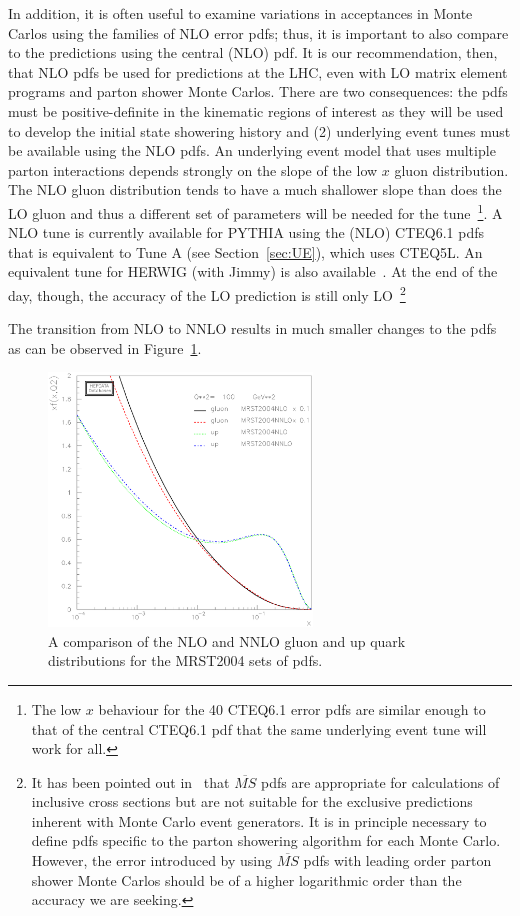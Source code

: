 \documentclass[12pt]{iopart}
\begin{document}
In addition, it is often useful to examine variations in acceptances in Monte Carlos using the
families of NLO error pdfs; thus, it is important to also compare to the predictions using the central (NLO) pdf.  It is our
recommendation, then,  that NLO pdfs be used for predictions at the LHC, even with LO matrix element programs and parton shower Monte
Carlos. There are two consequences: the pdfs must be positive-definite in the kinematic regions of interest as they will be
used to develop the initial state showering history and (2) underlying event tunes must be available using  the NLO pdfs. An
underlying event model that uses multiple parton interactions depends strongly on the slope of the low $x$  gluon  distribution.
The NLO gluon distribution  tends to have a much shallower slope than does the LO gluon and thus a different set of parameters
will  be needed for the tune~\footnote{The low $x$ behaviour for the 40 CTEQ6.1 error pdfs are similar
enough to that of the central CTEQ6.1 pdf that the same underlying event tune will work for all.}.
A NLO tune  is currently available for PYTHIA using the (NLO) CTEQ6.1 pdfs that is equivalent to
Tune A (see Section~\ref{sec:UE}), which uses CTEQ5L. An equivalent tune for HERWIG (with Jimmy)  is also available~\cite{Group:2006rt}.
At the end of the day, though,  the accuracy of the LO prediction is still only LO~\footnote{
It has been pointed out in~\cite{Collins:2002ey}
that $\overline{MS}$ pdfs are appropriate for calculations of inclusive cross sections but are not suitable for the exclusive
predictions inherent with Monte Carlo event generators. It is in principle necessary to define pdfs specific to the parton showering
algorithm for each Monte Carlo. However, the error introduced by using $\overline{MS}$ pdfs with leading order parton shower
Monte Carlos should be of a higher logarithmic order than the accuracy we are seeking.} 

The transition from NLO to NNLO results in much smaller changes to the pdfs as can be observed in
Figure~\ref{fig:plotpaw_nlo_nnlo}.
%
\begin{figure}[t]
\begin{center}
\includegraphics[width=7cm]{plotpaw_nlo_nnlo.ps}
\end{center}
\caption{
A comparison of the NLO and NNLO gluon and up quark distributions for the MRST2004 sets of pdfs. 
\label{fig:plotpaw_nlo_nnlo}
}
\end{figure}
%
\end{document}
